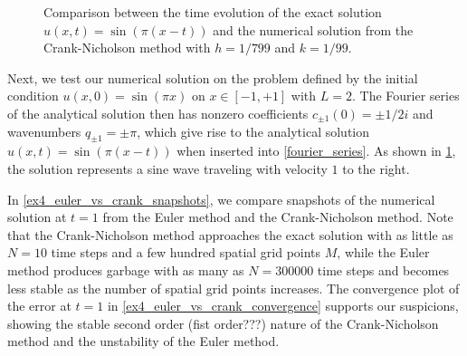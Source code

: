 \begin{figure}[b]
\centering
{}
\caption{\label{sine_evolution}Comparison between the time evolution of the exact solution $u(x,t)=\sin(\pi(x-t))$ and the numerical solution from the Crank-Nicholson method with $h=1/799$ and $k=1/99$.}
\end{figure}

Next, we test our numerical solution on the problem defined by the initial condition $u(x, 0) = \sin(\pi x)$ on $x \in [-1, +1]$ with $L = 2$.
The Fourier series of the analytical solution then has nonzero coefficients $c_{\pm1}(0) = \pm 1/2i$ and wavenumbers $q_{\pm 1} = \pm \pi$, which give rise to the analytical solution $u(x, t) = \sin(\pi(x-t))$ when inserted into \cref{fourier_series}.
As shown in \cref{sine_evolution}, the solution represents a sine wave traveling with velocity $1$ to the right.

In \cref{ex4_euler_vs_crank_snapshots}, we compare snapshots of the numerical solution at $t = 1$ from the Euler method and the Crank-Nicholson method.
Note that the Crank-Nicholson method approaches the exact solution with as little as $N=10$ time steps and a few hundred spatial grid points $M$, while the Euler method produces garbage with as many as $N=300000$ time steps and becomes less stable as the number of spatial grid points increases.
The convergence plot of the error at $t=1$ in \cref{ex4_euler_vs_crank_convergence} supports our suspicions, showing the stable second order (fist order???) nature of the Crank-Nicholson method and the unstability of the Euler method.

